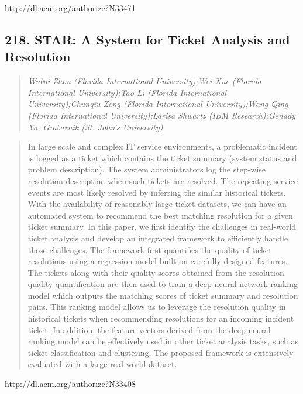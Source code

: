 \documentclass{article}
\begin{document}
\href{http://dl.acm.org/authorize?N33471}{http://dl.acm.org/authorize?N33471}

\subsection{218. STAR: A System for Ticket Analysis and Resolution}

\begin{quote}
\footnotesize{\textit{Wubai Zhou (Florida International University);Wei Xue (Florida International University);Tao Li (Florida International University);Chunqiu Zeng (Florida International University);Wang Qing (Florida International University);Larisa Shwartz (IBM Research);Genady Ya. Grabarnik (St. John's University)}}

\end{quote}

\begin{quote}
In large scale and complex IT service environments, a problematic incident is logged as a ticket which contains the ticket summary (system status and problem description). The system administrators log the step-wise resolution description when such tickets are resolved. The repeating service events are most likely resolved by inferring the similar historical tickets. With the availability of reasonably large ticket datasets, we can have an automated system to recommend the best matching resolution for a given ticket summary. In this paper, we first identify the challenges in real-world ticket analysis and develop an integrated framework to efficiently handle those challenges. The framework first quantifies the quality of ticket resolutions using a regression model built on carefully designed features. The tickets along with their quality scores obtained from the resolution quality quantification are then used to train a deep neural network ranking model which outputs the matching scores of ticket summary and resolution pairs. This ranking model allows us to leverage the resolution quality in historical tickets when recommending resolutions for an incoming incident ticket. In addition, the feature vectors derived from the deep neural ranking model can be effectively used in other ticket analysis tasks, such as ticket classification and clustering. The proposed framework is extensively evaluated with a large real-world dataset.
\end{quote}

\href{http://dl.acm.org/authorize?N33408}{http://dl.acm.org/authorize?N33408}
\end{document}

